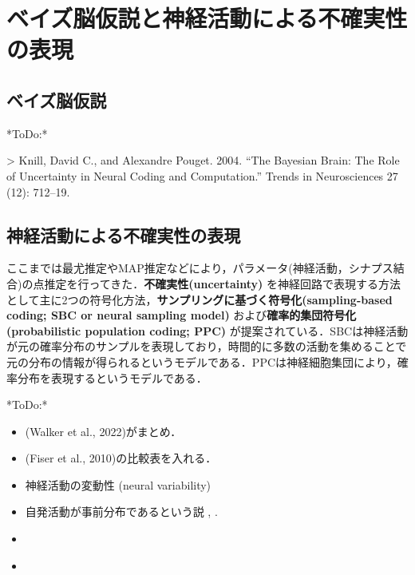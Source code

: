 \section{ベイズ脳仮説と神経活動による不確実性の表現}

\subsection{ベイズ脳仮説}
*ToDo:*

> Knill, David C., and Alexandre Pouget. 2004. “The Bayesian Brain: The Role of Uncertainty in Neural Coding and Computation.” Trends in Neurosciences 27 (12): 712–19.

\subsection{神経活動による不確実性の表現}
ここまでは最尤推定やMAP推定などにより，パラメータ(神経活動，シナプス結合)の点推定を行ってきた．\textbf{不確実性(uncertainty)} を神経回路で表現する方法として主に2つの符号化方法，\textbf{サンプリングに基づく符号化(sampling-based coding; SBC or neural sampling model)} および\textbf{確率的集団符号化(probabilistic population coding; PPC)} が提案されている．SBCは神経活動が元の確率分布のサンプルを表現しており，時間的に多数の活動を集めることで元の分布の情報が得られるというモデルである．PPCは神経細胞集団により，確率分布を表現するというモデルである．

*ToDo:*
\begin{itemize}
\item (Walker et al., 2022)がまとめ．
\item (Fiser et al., 2010)の比較表を入れる．
\item 神経活動の変動性 (neural variability)
\item 自発活動が事前分布であるという説 \cite{Fiser2010-kw}, \cite{Berkes2011-it}.
\item \cite{Hoyer2002-ci}
\item \cite{Sanborn2016-en}
\end{itemize}
